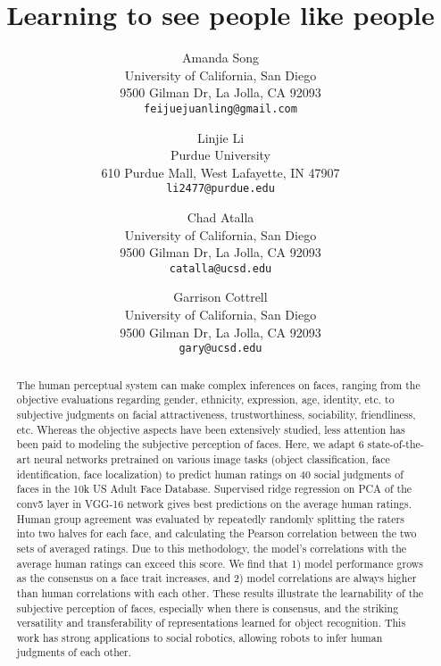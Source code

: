 \documentclass[10pt,twocolumn,letterpaper]{article}
\begin{document}
\title{Learning to see people like people}
\author{Amanda Song\\
University of California, San Diego\\
9500 Gilman Dr, La Jolla, CA 92093\\
{\tt\small feijuejuanling@gmail.com}
\and
Linjie Li\\
Purdue University\\
610 Purdue Mall, West Lafayette, IN 47907\\
{\tt\small li2477@purdue.edu}
\and
Chad Atalla\\
University of California, San Diego\\
9500 Gilman Dr, La Jolla, CA 92093\\
{\tt\small catalla@ucsd.edu}
\and
Garrison Cottrell\\
University of California, San Diego\\
9500 Gilman Dr, La Jolla, CA 92093\\
{\tt\small gary@ucsd.edu}
}
\maketitle
\begin{abstract}
The human perceptual system can make complex inferences on faces, ranging from the objective evaluations regarding gender, ethnicity, expression, age, identity, etc. to subjective judgments on facial attractiveness, trustworthiness, sociability, friendliness, etc. Whereas the objective aspects have been extensively studied, less attention has been paid to modeling the subjective perception of faces. Here, we adapt 6 state-of-the-art neural networks pretrained on various image tasks (object classification, face identification, face localization) to predict human ratings on 40 social judgments of faces in the 10k US Adult Face Database. Supervised ridge regression on PCA of the conv5 layer in VGG-16 network gives best predictions on the average human ratings. Human group agreement was evaluated by repeatedly randomly splitting the raters into two halves for each face, and calculating the Pearson correlation between the two sets of averaged ratings. Due to this methodology, the model’s correlations with the average human ratings can exceed this score. We find that 1) model performance grows as the consensus on a face trait increases, and 2) model correlations are always higher than human correlations with each other. These results illustrate the learnability of the subjective perception of faces, especially when there is consensus, and the striking versatility and transferability of representations learned for object recognition. This work has strong applications to social robotics, allowing robots to infer human judgments of each other.
\end{abstract}
\end{document}
